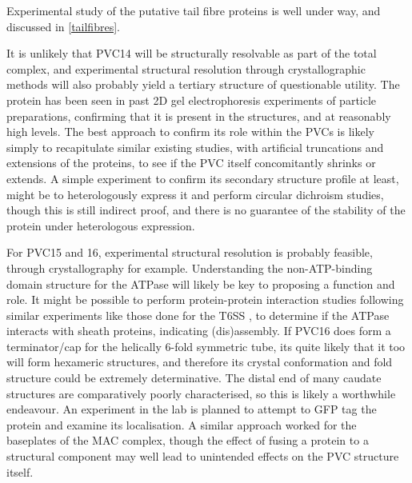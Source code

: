 Experimental study of the putative tail fibre proteins is well under way, and discussed in \vref{tailfibres}.

It is unlikely that PVC14 will be structurally resolvable as part of the total complex, and experimental structural resolution through crystallographic methods will also probably yield a tertiary structure of questionable utility. The protein has been seen in past 2D gel electrophoresis experiments of particle preparations, confirming that it is present in the structures, and at reasonably high levels. The best approach to confirm its role within the PVCs is likely simply to recapitulate similar existing studies, with artificial truncations and extensions of the proteins, to see if the PVC itself concomitantly shrinks or extends. A simple experiment to confirm its secondary structure profile at least, might be to heterologously express it and perform circular dichroism studies, though this is still indirect proof, and there is no guarantee of the stability of the protein under heterologous expression.

For PVC15 and 16, experimental structural resolution is probably feasible, through crystallography for example. Understanding the non-ATP-binding domain structure for the ATPase will likely be key to proposing a function and role. It might be possible to perform protein-protein interaction studies following similar experiments like those done for the T6SS \citep{Douzi2016}, to determine if the ATPase interacts with sheath proteins, indicating (dis)assembly. If PVC16 does form a terminator/cap for the helically 6-fold symmetric tube, its quite likely that it too will form hexameric structures, and therefore its crystal conformation and fold structure could be extremely determinative. The distal end of many caudate structures are comparatively poorly characterised, so this is likely a worthwhile endeavour. An experiment in the lab is planned to attempt to GFP tag the protein and examine its localisation. A similar approach worked for the baseplates of the MAC complex, though the effect of fusing a protein to a structural component may well lead to unintended effects on the PVC structure itself.



